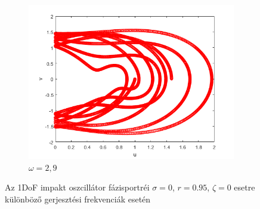 \begin{figure}[h!]
\begin{subfigure}[b]{0.31\linewidth}
         \centering
         \includegraphics[width=1\linewidth]{graphics/uv_w29_r095_omega0_ksi0.png}
         \caption{$\omega=2,9$}
         \label{fig:w290}
     \end{subfigure}
     \caption{Az 1DoF impakt oszcillátor fázisportréi $\sigma =0$, $r=0.95$, $\zeta =0$ esetre különböző gerjesztési frekvenciák esetén}\label{fig:phase}
\end{figure}

